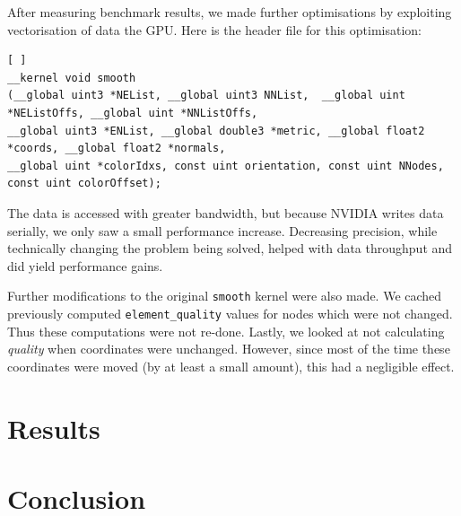 \documentclass[a4paper,11pt, twocolumn]{article}
\begin{document}
After measuring benchmark results, we made further optimisations by exploiting vectorisation of data the GPU.  Here is the header file for this optimisation:
\begin{lstlisting}[ ]
__kernel void smooth
(__global uint3 *NEList, __global uint3 NNList,  __global uint *NEListOffs, __global uint *NNListOffs,
__global uint3 *ENList, __global double3 *metric, __global float2 *coords, __global float2 *normals,
__global uint *colorIdxs, const uint orientation, const uint NNodes, const uint colorOffset);
\end{lstlisting}
The data is accessed with greater bandwidth, but because NVIDIA writes data serially, we only saw a small performance increase.  Decreasing precision, while technically changing the problem being solved, helped with data throughput and did yield performance gains.

Further modifications to the original \verb+smooth+ kernel were also made.  We cached previously computed \verb+element_quality+ values for nodes which were not changed.  Thus these computations were not re-done.  Lastly, we looked at not calculating \emph{quality} when coordinates were unchanged.  However, since most of the time these coordinates were moved (by at least a small amount), this had a negligible effect.

\section{Results}



\section{Conclusion}


\end{document}
